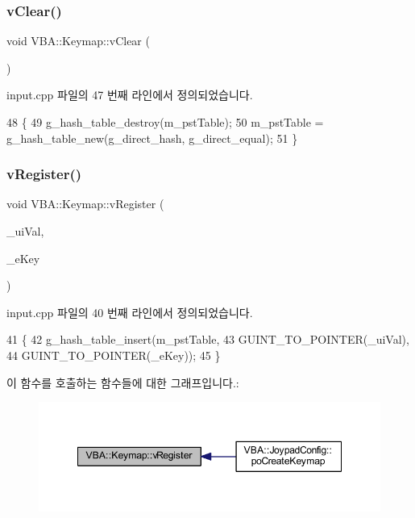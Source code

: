 \subsubsection{\texorpdfstring{v\+Clear()}{vClear()}}
{\footnotesize\ttfamily void V\+B\+A\+::\+Keymap\+::v\+Clear (\begin{DoxyParamCaption}{ }\end{DoxyParamCaption})}



input.\+cpp 파일의 47 번째 라인에서 정의되었습니다.


\begin{DoxyCode}
48 \{
49   g\_hash\_table\_destroy(m\_pstTable);
50   m\_pstTable = g\_hash\_table\_new(g\_direct\_hash, g\_direct\_equal);
51 \}
\end{DoxyCode}
\mbox{\label{class_v_b_a_1_1_keymap_a016d13905248b39677f9be0382616d79}} 
\subsubsection{\texorpdfstring{v\+Register()}{vRegister()}}
{\footnotesize\ttfamily void V\+B\+A\+::\+Keymap\+::v\+Register (\begin{DoxyParamCaption}\item[{guint}]{\+\_\+ui\+Val,  }\item[{\mbox{\hyperlink{class_v_b_a_a5839ea5408735bd8ce070c4c245750cc}{E\+Key}}}]{\+\_\+e\+Key }\end{DoxyParamCaption})}



input.\+cpp 파일의 40 번째 라인에서 정의되었습니다.


\begin{DoxyCode}
41 \{
42   g\_hash\_table\_insert(m\_pstTable,
43                       GUINT\_TO\_POINTER(\_uiVal),
44                       GUINT\_TO\_POINTER(\_eKey));
45 \}
\end{DoxyCode}
이 함수를 호출하는 함수들에 대한 그래프입니다.\+:
\nopagebreak
\begin{figure}[H]
\begin{center}
\leavevmode
\includegraphics[width=348pt]{class_v_b_a_1_1_keymap_a016d13905248b39677f9be0382616d79_icgraph}
\end{center}
\end{figure}


